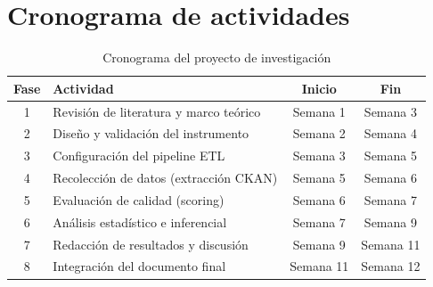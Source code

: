 \documentclass[12pt,letterpaper]{article}
\begin{document}
\section{Cronograma de actividades}

\begin{table}[h]
\centering
\caption{Cronograma del proyecto de investigación}
\label{tab:cronograma}
\begin{tabular}{clcc}
\toprule
\textbf{Fase} & \textbf{Actividad} & \textbf{Inicio} & \textbf{Fin} \\
\midrule
1 & Revisión de literatura y marco teórico & Semana 1 & Semana 3 \\
2 & Diseño y validación del instrumento & Semana 2 & Semana 4 \\
3 & Configuración del pipeline ETL & Semana 3 & Semana 5 \\
4 & Recolección de datos (extracción CKAN) & Semana 5 & Semana 6 \\
5 & Evaluación de calidad (scoring) & Semana 6 & Semana 7 \\
6 & Análisis estadístico e inferencial & Semana 7 & Semana 9 \\
7 & Redacción de resultados y discusión & Semana 9 & Semana 11 \\
8 & Integración del documento final & Semana 11 & Semana 12 \\
\bottomrule
\end{tabular}
\end{table}

\printbibliography[title={Bibliografía consultada}]
\end{document}
